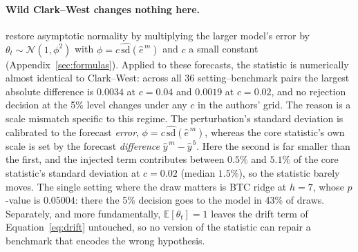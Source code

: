 \documentclass{article}
\theoremstyle{plain}
\theoremstyle{definition}
\begin{document}
\paragraph{Wild Clark--West changes nothing here.}
\citet{pincheira2021} restore asymptotic normality by multiplying the larger
model's error by $\theta_t \sim \mathcal{N}(1,\phi^2)$ with
$\phi = c\,\widehat{\mathrm{sd}}(\hat e^{\,m})$ and $c$ a small constant
(Appendix~\ref{sec:formulas}). Applied to these forecasts, the statistic is
numerically almost identical to Clark--West: across all 36 setting--benchmark pairs
the largest absolute difference is $0.0034$ at $c = 0.04$ and $0.0019$ at
$c = 0.02$, and no rejection decision at the 5\% level changes under any $c$ in the
authors' grid. The reason is a scale mismatch specific to this regime. The
perturbation's standard deviation is calibrated to the forecast \emph{error},
$\phi = c\,\widehat{\mathrm{sd}}(\hat e^{\,m})$, whereas the core statistic's own
scale is set by the forecast \emph{difference} $\hat y^{\,m} - \hat y^{\,b}$. Here
the second is far smaller than the first, and the injected term contributes between
$0.5\%$ and $5.1\%$ of the core statistic's standard deviation at $c = 0.02$
(median $1.5\%$), so the statistic barely moves. The single setting where the draw
matters is BTC
ridge at $h=7$, whose $p$-value is $0.05004$: there the 5\% decision goes to the
model in 43\% of draws. Separately, and more fundamentally, $\mathbb{E}[\theta_t]=1$
leaves the drift term of Equation~\eqref{eq:drift} untouched, so no version of the
statistic can repair a benchmark that encodes the wrong hypothesis.

\begin{table}[t]
  \centering
  \caption{Outcome of each test and correction across the 18 machine-learning
  settings. Direction is required, not merely significance: a Diebold--Mariano
  rejection is attributed to whichever side the statistic's sign favours.}
  \label{tab:inference}
  \small
  
\end{table}
\end{document}
